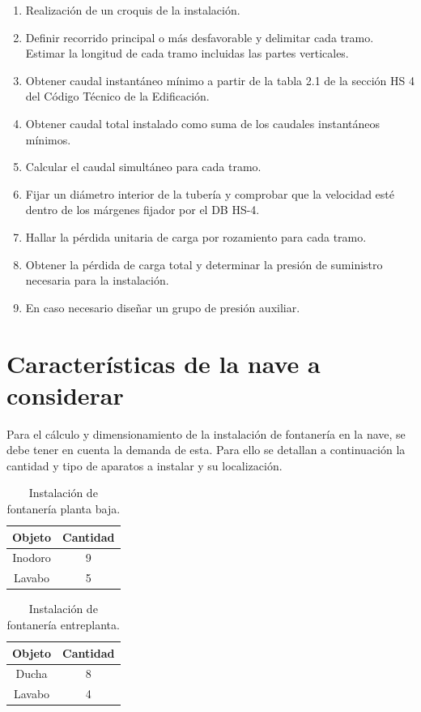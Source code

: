 \documentclass[../main.tex]{subfiles}
\begin{document}
\begin{enumerate}
    \item Realización de un croquis de la instalación.
    \item Definir recorrido principal o más desfavorable y delimitar cada tramo. Estimar la longitud de cada tramo incluidas las partes verticales.
    \item Obtener caudal instantáneo mínimo a partir de la tabla 2.1 de la sección HS 4 del Código Técnico de la Edificación.
    \item Obtener caudal total instalado como suma de los caudales instantáneos mínimos.
    \item Calcular el caudal simultáneo para cada tramo.
    \item Fijar un diámetro interior de la tubería y comprobar que la velocidad esté dentro de los márgenes fijador por el DB HS-4. 
    \item Hallar la pérdida unitaria de carga por rozamiento para cada tramo.
    \item Obtener la pérdida de carga total y determinar la presión de suministro necesaria para la instalación.
    \item En caso necesario diseñar un grupo de presión auxiliar.
\end{enumerate}

\section{Características de la nave a considerar}
Para el cálculo y dimensionamiento de la instalación de fontanería en la nave, se debe tener en cuenta la demanda de esta. Para ello se detallan a continuación la cantidad y tipo de aparatos a instalar y su localización. 
\begin{table}[H]
    \centering
    \begin{tabular}{c|c}
         Objeto & Cantidad \\ \hline
         Inodoro & 9 \\
         Lavabo & 5 
    \end{tabular}
    \caption{Instalación de fontanería planta baja.}
\end{table}

\begin{table}[H]
    \centering
    \begin{tabular}{c|c}
         Objeto & Cantidad \\ \hline
         Ducha & 8 \\
         Lavabo & 4 
    \end{tabular}
    \caption{Instalación de fontanería entreplanta.}
\end{table}
\end{document}
